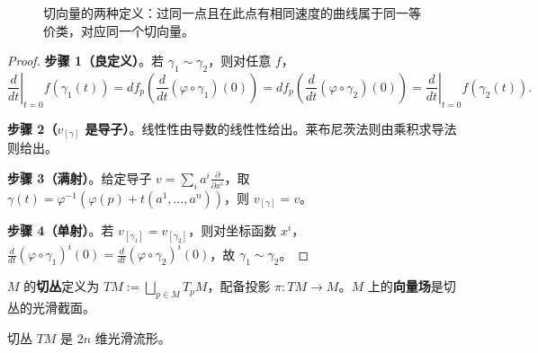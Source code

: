 \begin{figure}[htbp]
\centering
{}
\caption{切向量的两种定义：过同一点且在此点有相同速度的曲线属于同一等价类，对应同一个切向量。}
\label{fig:tangent_vector_equivalence}
\end{figure}

\begin{proof}
\textbf{步骤 1（良定义）}。若 $\gamma_1 \sim \gamma_2$，则对任意 $f$，
\[
\left. \frac{d}{dt} \right|_{t=0} f(\gamma_1(t)) = df_p\left( \frac{d}{dt}(\varphi\circ\gamma_1)(0) \right) = df_p\left( \frac{d}{dt}(\varphi\circ\gamma_2)(0) \right) = \left. \frac{d}{dt} \right|_{t=0} f(\gamma_2(t)).
\]

\textbf{步骤 2（$v_{[\gamma]}$ 是导子）}。线性性由导数的线性性给出。莱布尼茨法则由乘积求导法则给出。

\textbf{步骤 3（满射）}。给定导子 $v = \sum_i a^i \frac{\partial}{\partial x^i}$，取 $\gamma(t) = \varphi^{-1}(\varphi(p) + t(a^1, \dots, a^n))$，则 $v_{[\gamma]} = v$。

\textbf{步骤 4（单射）}。若 $v_{[\gamma_1]} = v_{[\gamma_2]}$，则对坐标函数 $x^i$，$\frac{d}{dt}(\varphi \circ \gamma_1)^i(0) = \frac{d}{dt}(\varphi \circ \gamma_2)^i(0)$，故 $\gamma_1 \sim \gamma_2$。
\end{proof}

\begin{definition}[切丛]\label{def:tangent_bundle}
$M$ 的\textbf{切丛}定义为 $TM := \bigsqcup_{p \in M} T_pM$，配备投影 $\pi: TM \to M$。$M$ 上的\textbf{向量场}是切丛的光滑截面。
\end{definition}

\begin{proposition}[切丛的流形结构]\label{prop:tangent_bundle_manifold}
切丛 $TM$ 是 $2n$ 维光滑流形。
\end{proposition}

